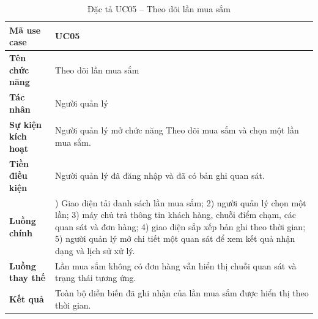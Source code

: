 \documentclass[../LuanVan.tex]{subfiles}
\begin{document}
\begin{table}[H]
    \centering
    \caption{Đặc tả UC05 -- Theo dõi lần mua sắm}
    \label{tab:uc05_visit_ch4}
    \begin{tabular}{|>{\raggedright\arraybackslash}p{3.0cm}|>{\raggedright\arraybackslash}p{10.9cm}|}
        \hline
        \textbf{Mã use case} & UC05 \\
        \hline
        \textbf{Tên chức năng} & Theo dõi lần mua sắm \\
        \hline
        \textbf{Tác nhân} & Người quản lý \\
        \hline
        \textbf{Sự kiện kích hoạt} & Người quản lý mở chức năng Theo dõi mua sắm và chọn một lần mua sắm. \\
        \hline
        \textbf{Tiền điều kiện} & Người quản lý đã đăng nhập và đã có bản ghi quan sát. \\
        \hline
        \textbf{Luồng chính} & 1) Giao diện tải danh sách lần mua sắm; 2) người quản lý chọn một lần; 3) máy chủ trả thông tin khách hàng, chuỗi điểm chạm, các quan sát và đơn hàng; 4) giao diện sắp xếp bản ghi theo thời gian; 5) người quản lý mở chi tiết một quan sát để xem kết quả nhận dạng và lịch sử xử lý. \\
        \hline
        \textbf{Luồng thay thế} & Lần mua sắm không có đơn hàng vẫn hiển thị chuỗi quan sát và trạng thái tương ứng. \\
        \hline
        \textbf{Kết quả} & Toàn bộ diễn biến đã ghi nhận của lần mua sắm được hiển thị theo thời gian. \\
        \hline
    \end{tabular}
\end{table}
\end{document}
